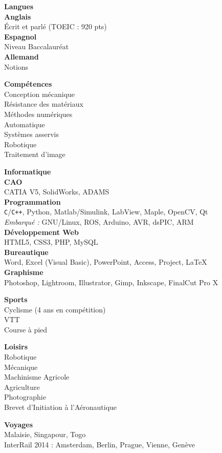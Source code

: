 \documentclass[a4paper,11pt,final]{memoir}
\newcommand{\SmallSep}{\vspace{0.5em}}
\newcommand{\SkillSection}[1]
	{\normalsize{\textbf{#1\\}}\normalfont\small}%
\newcommand{\SkillItem}[1]
	{\textbf{\color{RoyalBlue} #1}\normalfont\\}
\begin{document}
\begin{flushleft}
\SkillSection{Langues}
\SkillItem{Anglais}
Écrit et parlé (TOEIC : 920 pts)\\
\SkillItem{Espagnol}
Niveau Baccalauréat\\
\SkillItem{Allemand}
Notions
\SmallSep

\SkillSection{Compétences}
Conception mécanique\\
Résistance des matériaux\\
Méthodes numériques\\
Automatique\\
Systèmes asservis\\
Robotique\\
Traitement d'image
\SmallSep

\SkillSection{Informatique}
\SkillItem{CAO}
CATIA V5, SolidWorks, ADAMS\\
\SkillItem{Programmation}
\verb!C!/\verb!C++!, Python, Matlab/Simulink, LabView, Maple, OpenCV, Qt\\
\emph{Embarqué :} GNU/Linux, ROS, Arduino, AVR, dsPIC, ARM\\%
\SkillItem{Développement Web}
HTML5, CSS3, PHP, MySQL\\
\SkillItem{Bureautique}
Word, Excel (Visual Basic), PowerPoint, Access, Project, \LaTeX\\
\SkillItem{Graphisme}
Photoshop, Lightroom, Illustrator, Gimp, Inkscape, FinalCut Pro X\\
\SmallSep

\SkillSection{Sports}
Cyclisme (4 ans en compétition)\\
VTT\\
Course à pied\\
\SmallSep

\SkillSection{Loisirs}
Robotique\\
Mécanique\\
Machinisme Agricole\\
Agriculture\\
Photographie\\
Brevet d'Initiation à l'Aéronautique
\SmallSep

\SkillSection{Voyages}
Malaisie, Singapour, Togo\\
InterRail 2014 : Amsterdam, Berlin, Prague, Vienne, Genève
\end{flushleft}
\framebreak
\end{document}
